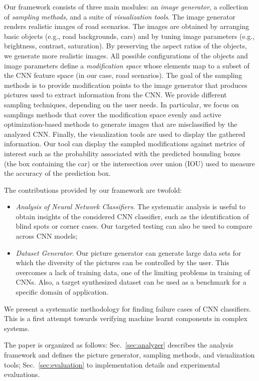 \documentclass[10pt,journal,cspaper,final,twocolumn,compsoc]{./IEEEtran}
\begin{document}
Our framework consists of three main modules: an \emph{image generator},
a collection of \emph{sampling methods}, and a suite of \emph{visualization tools}.
The image generator renders realistic images of road scenarios.
The images are obtained by arranging basic objects
(e.g., road backgrounds, cars) and by tuning
image parameters (e.g., brightness, contrast, saturation). By preserving the aspect ratios of the objects, we generate more realistic images. 
All possible configurations of the objects and image parameters define a \emph{modification space} whose elements map to a subset of the CNN feature space (in our case, road scenarios).
The goal of the sampling methods is to provide modification points
to the image generator that produces pictures used to 
extract information from the CNN. We provide different sampling techniques, depending on the 
user needs. In particular, we focus on samplings methods
that cover the modification space evenly and active optimization-based methods to generate images that are misclassified by the analyzed CNN.
Finally, the visualization tools are used to display the gathered information.
Our tool can display the sampled modifications against metrics of interest such as 
the probability associated with the predicted bounding boxes (the box containing the car) or the intersection over union
(IOU) used to measure the accuracy of the prediction box.

The contributions provided by our framework are twofold:
\begin{itemize}
	\item \emph{Analysis of Neural Network Classifiers}. The systematic analysis is
		useful to obtain insights of the considered CNN classifier,
		such as the identification of blind spots or corner cases. 
		Our targeted testing can also be used to
		compare across CNN models;
	\item \emph{Dataset Generator}. Our picture generator can
		generate large data sets for which the diversity
		of the pictures can be controlled by the user.
		This overcomes a lack of training data,
		one of the limiting problems in training of CNNs.
		Also, a target synthesized dataset can be used as a 
		benchmark for a specific domain of application.
\end{itemize}

We present a systematic methodology for finding failure cases of CNN classifiers. This is a first attempt towards verifying machine learnt components in complex systems.

The paper is organized as follows: Sec.~\ref{sec:analyzer} describes the
analysis framework and defines the picture generator, sampling methods,
and visualization tools; Sec.~\ref{sec:evaluation} to implementation
details and experimental evaluations.
\end{document}
